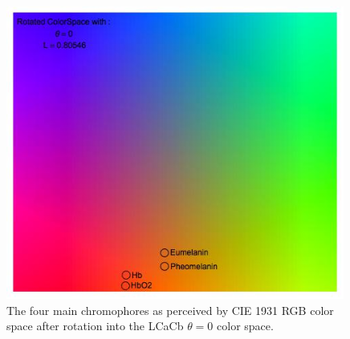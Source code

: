 \begin{figure}[h!]
  \centering
    \includegraphics[width=0.99\textwidth]{Chapter1/Figs/ChromophoresYAB.jpg}
    \caption{The four main chromophores as perceived by CIE 1931 RGB color space after rotation into the LCaCb $\theta = 0$ color space.}  \label{fig:ChromophoresYAB}
\end{figure}